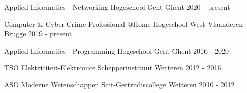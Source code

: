 

\begin{cventries}
	
\cventry
{Applied Informatics - Networking} %
{Hogeschool Gent} %
{Ghent} %
{2020 - present} %
{
}

\cventry
{Computer \& Cyber Crime Professional @Home} %
{Hogeschool West-Vlaanderen} %
{Brugge} %
{2019 - present} %
{
}

\cventry
{Applied Informatics - Programming} %
{Hogeschool Gent} %
{Ghent} %
{2016 - 2020} %
{
}

\cventry
{TSO Elektriciteit-Elektronice} %
{Schepperinstituut} %
{Wetteren} %
{2012 - 2016} %
{
}

  \cventry
    {ASO Moderne Wetenschappen} %
    {Sint-Gertrudiscollege} %
    {Wetteren} %
    {2010 - 2012} %
    {
    }

\end{cventries}
